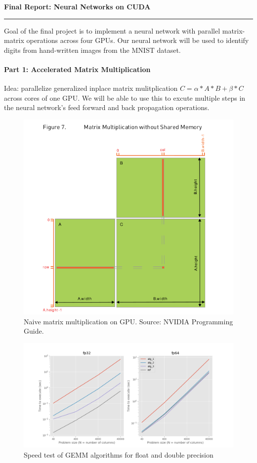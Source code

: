 \documentclass[12pt,letterpaper,twoside]{article}
\begin{document}
{\centering \textbf{Final Report: Neural Networks on CUDA\\}}
\vspace*{-8pt}\noindent\rule{\linewidth}{1pt}

Goal of the final project is to implement a neural network with parallel 
matrix-matrix operations across four GPUs. Our neural network will be used
to identify digits from hand-written images from the MNIST dataset.

\paragraph{Part 1: Accelerated Matrix Multiplication} Idea: parallelize generalized
inplace matrix mulitplication $C = \alpha*A*B + \beta*C$ across cores of one GPU. We 
will be able to use this to excute multiple steps in the neural network's feed forward 
and back propagation operations.

\begin{figure}[!htbp]
    \centering
    \includegraphics[scale=0.7]{gemm_naive.png}
    \caption{Naive matrix multiplication on GPU. Source: NVIDIA Programming Guide.}
\end{figure}

\begin{figure}[!htbp]
    \centering
    \includegraphics[scale=0.6]{speed_alg_vs_problem_size.png}
    \caption{Speed test of GEMM algorithms for float and double precision}
\end{figure}
\end{document}

